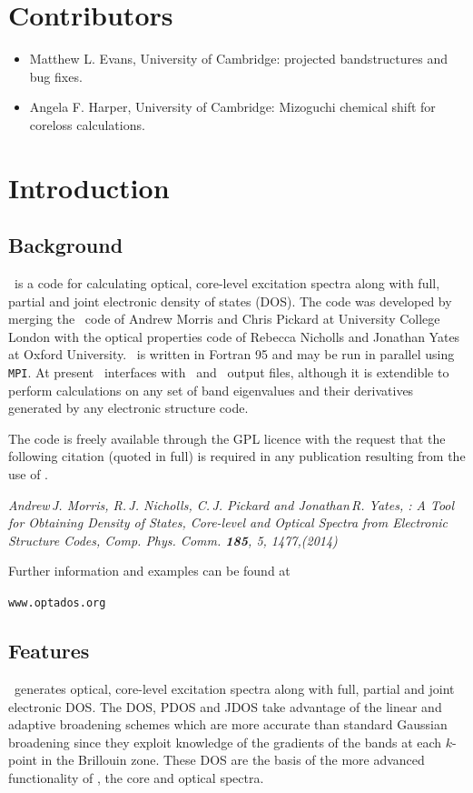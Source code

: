 \documentclass[a4paper,11pt,twoside]{book}
\begin{document}
\chapter*{Contributors}
 \thispagestyle{empty}

\begin{itemize}
\item Matthew L. Evans, University of Cambridge: projected bandstructures and bug fixes.
\item Angela F. Harper, University of Cambridge: Mizoguchi chemical shift for coreloss calculations.
\end{itemize}

\chapter{Introduction}\label{chap:introduction}
\section{Background}
\optados\ is a code for calculating optical, core-level excitation spectra along with full, partial and joint electronic density of states (DOS).  The code was developed by merging the \lindos\ code of Andrew Morris and Chris Pickard at University College London with the optical properties code of Rebecca Nicholls and Jonathan Yates at Oxford University.  \optados\ is written in Fortran 95 and may be run in parallel using {\tt MPI}.  At present \optados\ interfaces with \castep\ and \onetep\ output files, although it is extendible to perform calculations on any set of band eigenvalues and their derivatives generated by any electronic structure code.

The code is freely available through the GPL licence with the request that the following citation (quoted in full) is required in any publication resulting from the use of \optados.

\emph{Andrew\,J. Morris, R.\,J. Nicholls, C.\,J. Pickard and Jonathan\,R. Yates, \optados: A Tool for Obtaining Density of States, Core-level and Optical Spectra from Electronic Structure Codes,  Comp. Phys. Comm. {\bf 185}, 5, 1477,(2014)}

\begin{center}
Further information and examples can be found at

\verb#www.optados.org#
\end{center}


\section{Features}
\optados\ generates optical, core-level excitation spectra along with full, partial and joint electronic DOS. The DOS, PDOS and JDOS take advantage of the linear and adaptive broadening schemes which are more accurate than standard Gaussian broadening since they exploit knowledge of the gradients of the bands at each $k$-point in the Brillouin zone.  These DOS are the basis of the more advanced functionality of \optados, the core and optical spectra.
\end{document}
